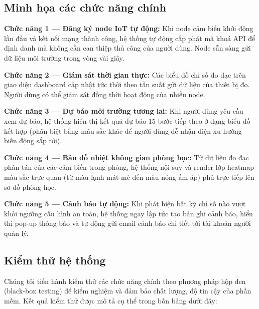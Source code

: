 \subsection{Minh họa các chức năng chính}
\label{subsec:design:demo}

\textbf{Chức năng 1 --- Đăng ký node IoT tự động:} Khi node cảm biến khởi động lần đầu và kết nối mạng thành công, hệ thống tự động cấp phát mã khoá API để định danh mà không cần can thiệp thủ công của người dùng. Node sẵn sàng gửi dữ liệu môi trường trong vòng vài giây.

\textbf{Chức năng 2 --- Giám sát thời gian thực:} Các biểu đồ chỉ số đo đạc trên giao diện dashboard cập nhật tức thời theo tần suất gửi dữ liệu của thiết bị đo. Người dùng có thể giám sát đồng thời hoạt động của nhiều node.

\textbf{Chức năng 3 --- Dự báo môi trường tương lai:} Khi người dùng yêu cầu xem dự báo, hệ thống hiển thị kết quả dự báo 15 bước tiếp theo ở dạng biểu đồ kết hợp (phân biệt bằng màu sắc khác để người dùng dễ nhận diện xu hướng biến động sắp tới).

\textbf{Chức năng 4 --- Bản đồ nhiệt không gian phòng học:} Từ dữ liệu đo đạc phân tán của các cảm biến trong phòng, hệ thống nội suy và render lớp heatmap màu sắc trực quan (từ màu lạnh mát mẻ đến màu nóng ấm áp) phủ trực tiếp lên sơ đồ phòng học.

\textbf{Chức năng 5 --- Cảnh báo tự động:} Khi phát hiện bất kỳ chỉ số nào vượt khỏi ngưỡng cấu hình an toàn, hệ thống ngay lập tức tạo bản ghi cảnh báo, hiển thị pop-up thông báo và tự động gửi email cảnh báo chi tiết tới tài khoản người quản lý.

\subsection{Kiểm thử hệ thống}
\label{sec:design:test}

Chúng tôi tiến hành kiểm thử các chức năng chính theo phương pháp hộp đen (black-box testing) để kiểm nghiệm và đảm bảo chất lượng, độ tin cậy của phần mềm. Kết quả kiểm thử được mô tả cụ thể trong bốn bảng dưới đây:

